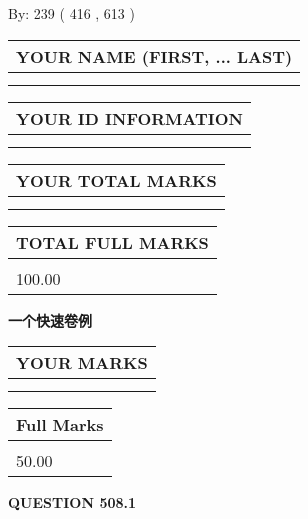 \documentclass{ctexart}
\begin{document}
   
\hspace{1.0in} By: 
 239 ( 416 ,  613 )
   
   
   
   
\newpage 
\setcounter{page}{ 
   508001 } 
   
   
   
   
\noindent\begin{tabular}{|l|}
\hline
YOUR NAME (FIRST, ... LAST)  \\
\hline
 \\ 
 \\ 
\hline
\end{tabular}
\hspace{0.05in} \begin{tabular}{|l|}
\hline
 YOUR   ID   INFORMATION  \\
\hline
 \\ 
 \\ 
\hline
\end{tabular}
   
   
\vspace{0.2in}\noindent\begin{tabular}{|l|}
\hline
YOUR TOTAL MARKS  \\
\hline
 \\ 
 \\ 
\hline
\end{tabular}
\hspace{0.05in} \begin{tabular}{|l|}
\hline
TOTAL FULL MARKS  \\
\hline
 \\ 
100.00 \\
\hline
\end{tabular}
   
   
 \vspace{0.2in}
{\LARGE {\textbf{ 一个快速卷例}}}
   
   
  
\vspace{0.2in}
  
\noindent\begin{tabular}{|l|}
\hline
 YOUR MARKS  \\
\hline
 \\ 
 \\ 
\hline
\end{tabular}
\hspace{0.05in} \begin{tabular}{|l|}
\hline
 Full Marks  \\
\hline
 \\ 
50.00 \\
\hline
\end{tabular}
{\textbf{\Large{QUESTION
508.1 
}}}
  
\end{document}

